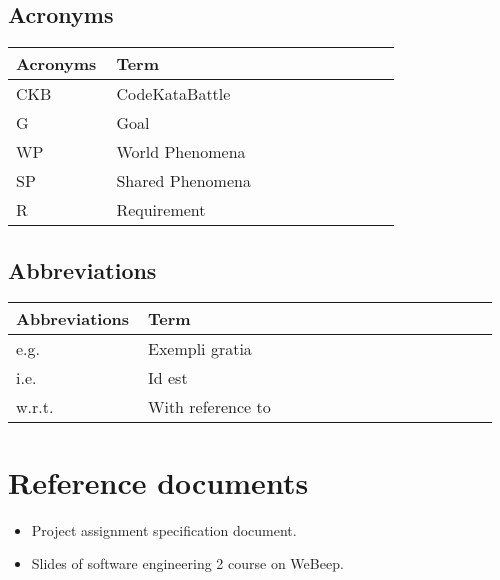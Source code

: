 \subsection{Acronyms}
\begin{center}
	\begin{tabular}{@{}p{0.25\linewidth} p{0.71\linewidth}@{}}
		\toprule
		\textbf{Acronyms} & \textbf{Term}\\
		\midrule
		CKB & CodeKataBattle\\
            G & Goal\\
		WP & World Phenomena\\
		SP & Shared Phenomena\\
            R & Requirement\\
		\bottomrule
	\end{tabular}
\end{center}

\subsection{Abbreviations}
\begin{center}
	\begin{tabular}{@{}p{0.25\linewidth} p{0.71\linewidth}@{}}
		\toprule
		\textbf{Abbreviations} & \textbf{Term}\\
		\midrule
		e.g. & Exempli gratia\\
		i.e. & Id est\\
		w.r.t. & With reference to\\
		\bottomrule
	\end{tabular}
\end{center}

\section{Reference documents}
\begin{itemize}
	\item Project assignment specification document.
	\item Slides of software engineering 2 course on WeBeep.
\end{itemize}


